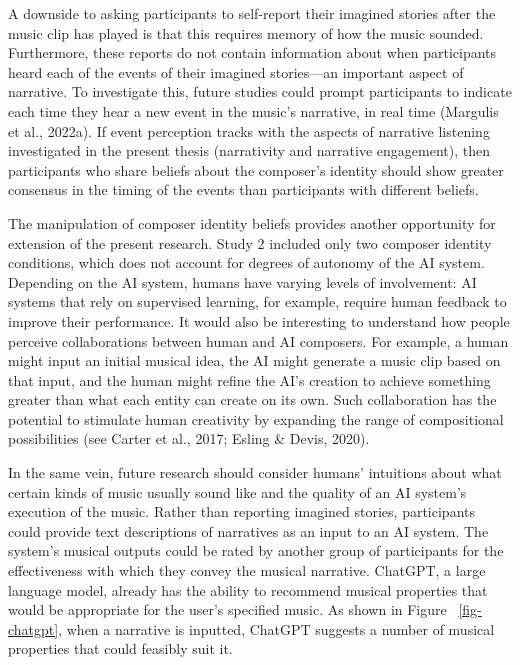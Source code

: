 \documentclass[12pt,twoside]{reedthesis}
\begin{document}
A downside to asking participants to self-report their imagined stories after the music clip has played is that this requires memory of how the music sounded. Furthermore, these reports do not contain information about when participants heard each of the events of their imagined stories—an important aspect of narrative. To investigate this, future studies could prompt participants to indicate each time they hear a new event in the music’s narrative, in real time (Margulis et al., 2022a). If event perception tracks with the aspects of narrative listening investigated in the present thesis (narrativity and narrative engagement), then participants who share beliefs about the composer’s identity should show greater consensus in the timing of the events than participants with different beliefs. 

The manipulation of composer identity beliefs provides another opportunity for extension of the present research. Study 2 included only two composer identity conditions, which does not account for degrees of autonomy of the AI system. Depending on the AI system, humans have varying levels of involvement: AI systems that rely on supervised learning, for example, require human feedback to improve their performance. It would also be interesting to understand how people perceive collaborations between human and AI composers. For example, a human might input an initial musical idea, the AI might generate a music clip based on that input, and the human might refine the AI’s creation to achieve something greater than what each entity can create on its own. Such collaboration has the potential to stimulate human creativity by expanding the range of compositional possibilities (see Carter et al., 2017; Esling \& Devis, 2020). 

In the same vein, future research should consider humans’ intuitions about what certain kinds of music usually sound like and the quality of an AI system’s execution of the music. Rather than reporting imagined stories, participants could provide text descriptions of narratives as an input to an AI system. The system’s musical outputs could be rated by another group of participants for the effectiveness with which they convey the musical narrative. ChatGPT, a large language model, already has the ability to recommend musical properties that would be appropriate for the user’s specified music. As shown in Figure ~\ref{fig-chatgpt}, when a narrative is inputted, ChatGPT suggests a number of musical properties that could feasibly suit it.
\end{document}
